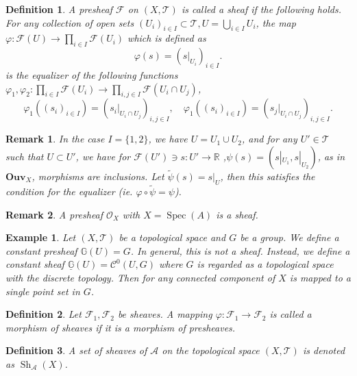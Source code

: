 \documentclass{article}
\newtheorem{definition}{Definition}[section]
\newtheorem{remark}{Remark}[section]
\newtheorem{example}{Example}[section]
\numberwithin{equation}{section}
\DeclareMathOperator{\Spec}{Spec}
\DeclareMathOperator{\Sh}{Sh}
\begin{document}
\begin{definition}
A presheaf $\mathcal{F}$ on $(X,\mathcal{T})$ is called a sheaf if the following holds.
For any collection of open sets $(U_i)_{i\in I}\subset \mathcal{T},U=\bigcup_{i\in I}U_i$, the map $\varphi:\mathcal{F}(U)\to\prod_{i\in I}\mathcal{F}(U_i)$ which is defined as
\begin{equation*}
\varphi(s) = (s|_{U_i})_{i\in I}.
\end{equation*}
is the equalizer of the following functions $\varphi_1,\varphi_2:\prod_{i\in I}\mathcal{F}(U_i)\to\prod_{i,j\in I}\mathcal{F}(U_i\cap U_j)$, 
\begin{equation*}
\varphi_1((s_i)_{i\in I}) = (s_i|_{U_i\cap U_j})_{i,j\in I},\quad\varphi_1((s_i)_{i\in I}) = (s_j|_{U_i\cap U_j})_{i,j\in I}.
\end{equation*}
\end{definition}

\begin{remark}
In the case $I=\{1,2\}$, we have $U=U_1\cup U_2$, and for any $U'\in\mathcal{T}$ such that $U\subset U'$, we have for $\mathcal{F}(U')\ni s:U'\to\mathbb{R}$ ,$\psi(s) = (s|_{U_1},s|_{U_2})$, as in $\mathbf{Ouv}_X$, morphisms are inclusions. Let $\tilde{\psi}(s) = s|_{U}$, then this satisfies the condition for the equalizer (ie. $\varphi\circ\tilde{\psi}=\psi$). 
\end{remark}

\begin{remark}
A presheaf $\mathcal{O}_X$ with $X=\Spec(A)$ is a sheaf.
\end{remark}

\begin{example}
Let $(X,\mathcal{T})$ be a topological space and $G$ be a group. We define a constant presheaf $\mathbb{G}(U) = G$. In general, this is not a sheaf. Instead, we define a constant sheaf $\underline{\mathbb{G}}(U) = \mathcal{C}^0(U,G)$ where $G$ is regarded as a topological space with the discrete topology. Then for any connected component of $X$ is mapped to a single point set in $G$.
\end{example}

\begin{definition}
Let $\mathcal{F}_1,\mathcal{F}_2$ be sheaves. A mapping $\varphi:\mathcal{F}_1\to\mathcal{F}_2$ is called a morphism of sheaves if it is a morphism of presheaves.
\end{definition}

\begin{definition}
A set of sheaves of $\mathcal{A}$ on the topological space $(X,\mathcal{T})$ is denoted as $\Sh_{\mathcal{A}}(X)$.
\end{definition}
\end{document}
